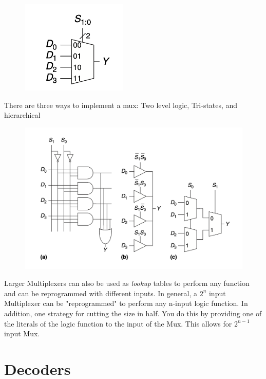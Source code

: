 \documentclass[12pt]{report}
\begin{document}
\begin{figure}[h!]
  \centering
  \includegraphics[width=2in]{4-bit-mux.png}
\end{figure}

\noindent There are three ways to implement a mux: Two level logic, Tri-states, and hierarchical

\begin{figure}[h!]
  \centering
  \includegraphics[width=6in]{n-bit-mux-implementation.png}
\end{figure}

\noindent Larger Multiplexers can also be used as \textit{lookup} tables to perform any function and can be reprogrammed with different inputs. 
In general, a $2^n$ input Multiplexer can be "reprogrammed" to perform any n-input logic function. In addition, one strategy for cutting the size in
half. You do this by providing one of the literals of the logic function to the input of the Mux. This allows for $2^{n-1}$ input Mux. 

\pagebreak

\section{Decoders}
\end{document}
